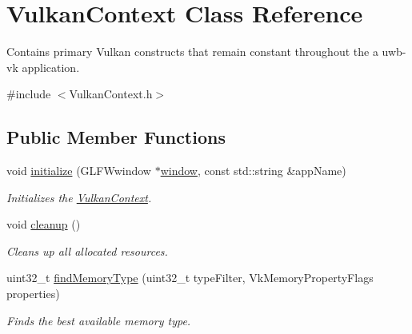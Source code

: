 \hypertarget{class_vulkan_context}{}\section{Vulkan\+Context Class Reference}
\label{class_vulkan_context}


Contains primary Vulkan constructs that remain constant throughout the a uwb-\/vk application.  




{\ttfamily \#include $<$Vulkan\+Context.\+h$>$}

\subsection*{Public Member Functions}
\begin{DoxyCompactItemize}
\item 
void \mbox{\hyperlink{class_vulkan_context_ad16e483649f2b66fe9659f473765dc35}{initialize}} (G\+L\+F\+Wwindow $\ast$\mbox{\hyperlink{class_vulkan_context_ac1c5718ae7cdbcce4dec66cfacc3c7b2}{window}}, const std\+::string \&app\+Name)
\begin{DoxyCompactList}\small\item\em Initializes the \mbox{\hyperlink{class_vulkan_context}{Vulkan\+Context}}. \end{DoxyCompactList}\item 
\mbox{\label{class_vulkan_context_af801707b6c41d083806ff62ee4342fba}} 
void \mbox{\hyperlink{class_vulkan_context_af801707b6c41d083806ff62ee4342fba}{cleanup}} ()
\begin{DoxyCompactList}\small\item\em Cleans up all allocated resources. \end{DoxyCompactList}\item 
uint32\+\_\+t \mbox{\hyperlink{class_vulkan_context_aa38181d82d01ea61a372bf624d90cc36}{find\+Memory\+Type}} (uint32\+\_\+t type\+Filter, Vk\+Memory\+Property\+Flags properties)
\begin{DoxyCompactList}\small\item\em Finds the best available memory type. \end{DoxyCompactList}\end{DoxyCompactItemize}
